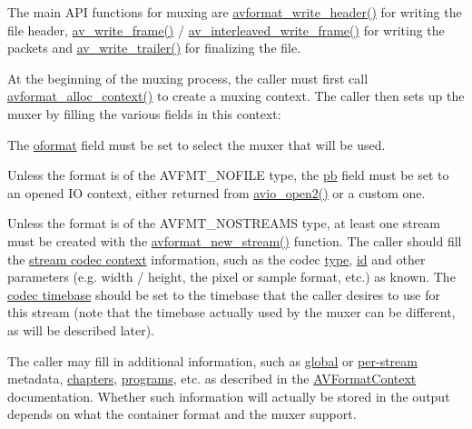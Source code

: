 The main A\+PI functions for muxing are \hyperlink{group__lavf__encoding_ga78d4e734fecb1d2385536e6dd5b7b9f5}{avformat\+\_\+write\+\_\+header()} for writing the file header, \hyperlink{group__lavf__encoding_gaa85cc1774f18f306cd20a40fc50d0b36}{av\+\_\+write\+\_\+frame()} / \hyperlink{group__lavf__encoding_ga37352ed2c63493c38219d935e71db6c1}{av\+\_\+interleaved\+\_\+write\+\_\+frame()} for writing the packets and \hyperlink{group__lavf__encoding_ga7f14007e7dc8f481f054b21614dfec13}{av\+\_\+write\+\_\+trailer()} for finalizing the file.

At the beginning of the muxing process, the caller must first call \hyperlink{group__lavf__core_gac7a91abf2f59648d995894711f070f62}{avformat\+\_\+alloc\+\_\+context()} to create a muxing context. The caller then sets up the muxer by filling the various fields in this context\+:


\begin{DoxyItemize}
\item The \hyperlink{struct_a_v_format_context_a20d80ac07e38ff5c268d15aaf2798b98}{oformat} field must be set to select the muxer that will be used.
\item Unless the format is of the A\+V\+F\+M\+T\+\_\+\+N\+O\+F\+I\+LE type, the \hyperlink{struct_a_v_format_context_a1e7324262b6b78522e52064daaa7bc87}{pb} field must be set to an opened IO context, either returned from \hyperlink{avio_8h_ade8a63980569494c99593ebf0d1e891b}{avio\+\_\+open2()} or a custom one.
\item Unless the format is of the A\+V\+F\+M\+T\+\_\+\+N\+O\+S\+T\+R\+E\+A\+MS type, at least one stream must be created with the \hyperlink{group__lavf__core_gadcb0fd3e507d9b58fe78f61f8ad39827}{avformat\+\_\+new\+\_\+stream()} function. The caller should fill the \hyperlink{struct_a_v_stream_a56f20051fb99339cc588cd3a07ab8c96}{stream codec context} information, such as the codec \hyperlink{struct_a_v_codec_context_a3f99ca3115c44e6d7772c9384faf15e6}{type}, \hyperlink{struct_a_v_codec_context_adc5f65d6099fd8339c1580c091777223}{id} and other parameters (e.\+g. width / height, the pixel or sample format, etc.) as known. The \hyperlink{struct_a_v_codec_context_ab7bfeb9fa5840aac090e2b0bd0ef7589}{codec timebase} should be set to the timebase that the caller desires to use for this stream (note that the timebase actually used by the muxer can be different, as will be described later).
\item The caller may fill in additional information, such as \hyperlink{struct_a_v_format_context_a3019a56080ed2e3297ff25bc2ff88adf}{global} or \hyperlink{struct_a_v_stream_a50d250a128a3da9ce3d135e84213fb82}{per-\/stream} metadata, \hyperlink{struct_a_v_format_context_ac17d5fc2dcdb00806cc83b02d9f940f3}{chapters}, \hyperlink{struct_a_v_format_context_a4c2c5a4c758966349ff513e95154d062}{programs}, etc. as described in the \hyperlink{struct_a_v_format_context}{A\+V\+Format\+Context} documentation. Whether such information will actually be stored in the output depends on what the container format and the muxer support.
\end{DoxyItemize}


